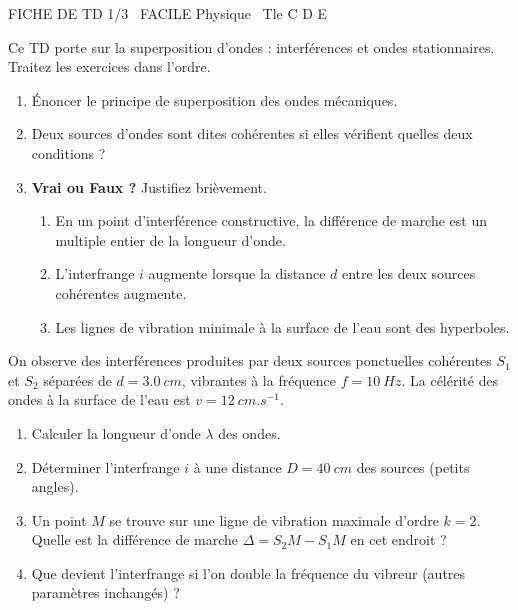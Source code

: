 \documentclass[11pt]{article}
\begin{document}
\begin{tcolorbox}[enhanced,colback=popink,colframe=popink,arc=10pt,boxrule=0pt,left=12pt,right=12pt,top=9pt,bottom=9pt]
{\color{white}\popxbold\small FICHE DE TD 1/3 \textbullet\ FACILE \hfill Physique \textbullet\ Tle C D E\par}
\end{tcolorbox}
\vspace{4pt}
Ce TD porte sur la superposition d'ondes : interférences et ondes stationnaires. Traitez les exercices dans l'ordre.

\begin{exercice}
\begin{enumerate}
    \item Énoncer le principe de superposition des ondes mécaniques.
    \item Deux sources d'ondes sont dites cohérentes si elles vérifient quelles deux conditions ?
    \item \textbf{Vrai ou Faux ?} Justifiez brièvement.
    \begin{enumerate}
        \item En un point d'interférence constructive, la différence de marche est un multiple entier de la longueur d'onde.
        \item L'interfrange $i$ augmente lorsque la distance $d$ entre les deux sources cohérentes augmente.
        \item Les lignes de vibration minimale à la surface de l'eau sont des hyperboles.
    \end{enumerate}
\end{enumerate}
\end{exercice}

\begin{exercice}
On observe des interférences produites par deux sources ponctuelles cohérentes $S_1$ et $S_2$ séparées de $d = \SI{3,0}{cm}$, vibrantes à la fréquence $f = \SI{10}{Hz}$. La célérité des ondes à la surface de l'eau est $v = \SI{12}{cm.s^{-1}}$.
\begin{enumerate}
    \item Calculer la longueur d'onde $\lambda$ des ondes.
    \item Déterminer l'interfrange $i$ à une distance $D = \SI{40}{cm}$ des sources (petits angles).
    \item Un point $M$ se trouve sur une ligne de vibration maximale d'ordre $k=2$. Quelle est la différence de marche $\Delta = S_2M - S_1M$ en cet endroit ?
    \item Que devient l'interfrange si l'on double la fréquence du vibreur (autres paramètres inchangés) ?
\end{enumerate}
\end{exercice}
\end{document}
